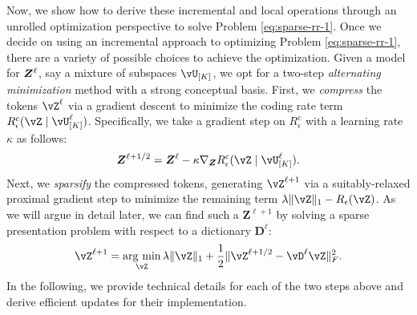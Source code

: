 \documentclass[\toplevelprefix/book-main.tex]{subfiles}
\begin{document}
Now, we show how to derive these incremental and local operations through an unrolled optimization perspective to solve Problem \eqref{eq:sparse-rr-1}.  Once we decide on using an incremental approach to optimizing Problem
\eqref{eq:sparse-rr-1}, there are a variety of possible choices to achieve the optimization. Given a model for $\bm{Z}^\ell$, say a mixture of subspaces $\vU_{[K]}$, we opt for a two-step \textit{alternating minimization} method with a strong conceptual basis. First, we \textit{compress} the tokens $\vZ^{\ell}$ via a gradient descent to minimize the coding rate term $R^c_\epsilon (\vZ \mid \vU_{[K]}^\ell)$. Specifically, we take a gradient step on $R^c_\epsilon$ with a learning rate $\kappa$ as follows:
\begin{align}\label{eq:Z l+1/2}
    \bm Z^{\ell+1/2} = \bm Z^\ell - \kappa \nabla_{\bm Z} R^c_\epsilon (\vZ \mid \vU_{[K]}^\ell). 
\end{align}
Next, we \textit{sparsify} the compressed tokens, generating \(\vZ^{\ell + 1}\) via a suitably-relaxed proximal gradient step to minimize the remaining term $\lambda \norm{\vZ}_{1} - R_{\epsilon}(\vZ)$. As we will argue in detail later, we can find such a $\bm Z^{\ell+1}$ by solving a sparse presentation problem with respect to a dictionary $\bm D^\ell$:
\begin{equation}\label{eq:Z l+1}
  \vZ^{\ell+1} = \argmin_{{\vZ}}  \lambda \norm{\vZ}_1 + \frac{1}{2}\norm{\vZ^{\ell + 1/2} - \vD^{\ell} {\vZ}}_F^2.
\end{equation}
In the following, we provide technical details for each of the two steps above and derive efficient updates for their implementation.
\end{document}
